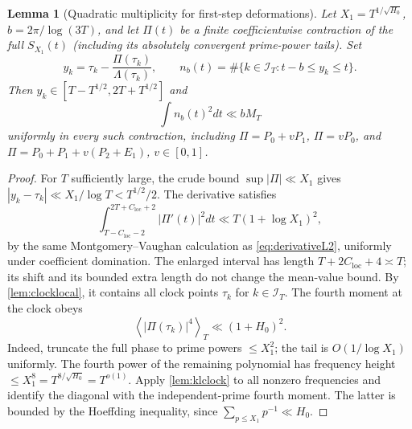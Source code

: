 \documentclass[11pt,reqno]{amsart}
\numberwithin{equation}{section}
\newtheorem{lemma}[theorem]{Lemma}
\newcommand{\av}[1]{\left\langle #1\right\rangle_T}
\newcommand{\Cloc}{C_{\mathrm{loc}}}
\begin{document}
\begin{lemma}[Quadratic multiplicity for first-step deformations]
\label{lem:multcorrected}
Let $X_1=T^{1/\sqrt{H_0}}$, $b=2\pi/\log(3T)$,
and let $\Pi(t)$ be a finite coefficientwise contraction of the
full $S_{X_1}(t)$ (including its absolutely convergent prime-power
tails).  Set
\[
y_k=\tau_k-\frac{\Pi(\tau_k)}{\Lambda(\tau_k)},\qquad
n_b(t)=\#\{k\in\mathcal I_T:t-b\le y_k\le t\}.
\]
Then $y_k\in[T-T^{1/2},2T+T^{1/2}]$ and
\begin{equation}\label{eq:multcorrected}
\int n_b(t)^2dt\ll bM_T
\end{equation}
uniformly in every such contraction, including
$\Pi=P_0+vP_1$, $\Pi=vP_0$, and
$\Pi=P_0+P_1+v(P_2+E_1)$, $v\in[0,1]$.
\end{lemma}
\begin{proof}
For $T$ sufficiently large, the crude bound
$\sup|\Pi|\ll X_1$ gives
$|y_k-\tau_k|\ll X_1/\log T<T^{1/2}/2$.
The derivative satisfies
\begin{equation}\label{eq:PiL2}
\int_{T-\Cloc-2}^{2T+\Cloc+2}|\Pi'(t)|^2dt
\ll T(1+\log X_1)^2,
\end{equation}
by the same Montgomery--Vaughan calculation as
\eqref{eq:derivativeL2}, uniformly under coefficient domination.
The enlarged interval has length $T+2\Cloc+4\asymp T$;
its shift and its bounded extra length do not change the
mean-value bound. By \cref{lem:clocklocal}, it contains all
clock points $\tau_k$ for $k\in\mathcal I_T$.
The fourth moment at the clock obeys
\begin{equation}\label{eq:PiL4}
\av{|\Pi(\tau_k)|^4}\ll(1+H_0)^2.
\end{equation}
Indeed, truncate the full phase to prime powers $\le X_1^2$;
the tail is $O(1/\log X_1)$ uniformly.  The fourth power of the
remaining polynomial has frequency height $\le X_1^8=T^{8/\sqrt{H_0}}
=T^{o(1)}$.  Apply \cref{lem:klclock} to all nonzero frequencies
and identify the diagonal with the independent-prime fourth moment.
The latter is bounded by the Hoeffding inequality, since
$\sum_{p\le X_1}p^{-1}\ll H_0$.


\end{proof}
\end{document}
